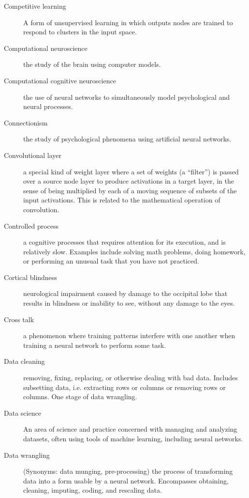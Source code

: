 \begin{description}
\item[Competitive learning] A form of unsupervised learning in which outputs nodes are trained to respond to clusters in the input space. 

\item[Computational neuroscience] the study of the brain using computer models.

\item[Computational cognitive neuroscience] the use of neural networks to simultaneously model psychological and neural processes.

\item[Connectionism] the study of psychological phenomena using artificial neural networks.

\item[Convolutional layer] a special kind of weight layer where a set of weights (a ``filter'') is passed over a source node layer to produce activations in a target layer, in the sense of being multiplied by each of a moving sequence of subsets of the input activations. This is related to the mathematical operation of convolution.

\item[Controlled process] a cognitive processes that requires attention for its execution, and is relatively slow. Examples include solving math problems, doing homework, or performing an  unusual task that you have not practiced.

\item[Cortical blindness] neurological impairment caused by damage to the occipital lobe that results in blindness or inability to see, without any damage to the eyes. 

\item[Cross talk] a phenomenon where training patterns interfere with one another when training a neural network to perform some task. 

\item[Data cleaning] removing, fixing, replacing, or otherwise dealing with bad data. Includes subsetting data, i.e. extracting rows or columns or removing rows or columns. One stage of data wrangling.

\item[Data science]  An area of science and practice concerned with managing and analyzing datasets, often using tools of machine learning, including neural networks.

\item[Data wrangling] (Synonyms: data munging, pre-processing) the process of transforming data into a form usable by a neural network. Encompasses obtaining, cleaning, imputing, coding, and rescaling data. 


\end{description}

